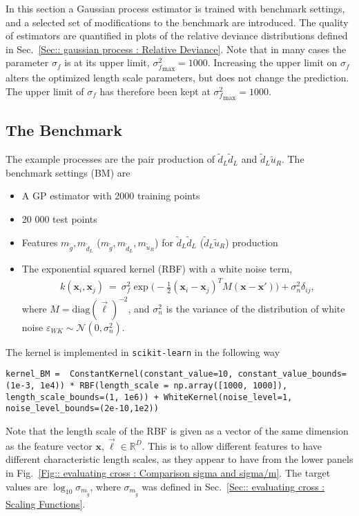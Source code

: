 \documentclass[twoside,english]{uiofysmaster}
\begin{document}
{In this section a Gaussian process estimator is trained with benchmark settings, and a selected set of modifications to the benchmark are introduced. The quality of estimators are quantified in plots of the relative deviance distributions defined in Sec.~\ref{Sec:: gaussian process : Relative Deviance}. Note that in many cases the parameter $\sigma_f$ is at its upper limit, ${\sigma_f^2}_{\mathrm{max}} = 1000$. Increasing the upper limit on $\sigma_f$ alters the optimized length scale parameters, but does not change the prediction. The upper limit of $\sigma_f$ has therefore been kept at ${\sigma_f^2}_{\mathrm{max}} = 1000$.

\subsection{The Benchmark}\label{Sec:: evaluating cross : The Benchmark}

The example processes are the pair production of $\widetilde{d}_L \widetilde{d}_L$ and $\widetilde{d}_L \widetilde{u}_R$. The benchmark settings (BM) are 
\begin{itemize}
\item A GP estimator with 2000 training points
\item 20 000 test points
\item Features $m_{\widetilde{g}}, m_{\widetilde{d}_L}$ ($m_{\widetilde{g}}, m_{\widetilde{d}_L}, m_{\widetilde{u}_R}$) for $\widetilde{d}_L \widetilde{d}_L$ ($\widetilde{d}_L \widetilde{u}_R$) production
\item The exponential squared kernel (RBF) with a white noise term, 
\begin{align}
k(\textbf{x}_i, \textbf{x}_j)~=~\sigma_f^2 \exp \big(-\frac{1}{2} (\textbf{x}_i-\textbf{x}_j)^TM(\textbf{x} - \textbf{x}') \big) + \sigma_n^2 \delta_{ij},
\end{align}
where $M = \textrm{diag}(\vec{\ell})^{-2}$, and $\sigma_n^2$ is the variance of the distribution of white noise $\varepsilon_{WK} \sim \mathcal{N}(0, \sigma_n^2)$.
\end{itemize}
The kernel is implemented in \verb|scikit-learn| in the following way 
\begin{lstlisting}
kernel_BM =  ConstantKernel(constant_value=10, constant_value_bounds=(1e-3, 1e4)) * RBF(length_scale = np.array([1000, 1000]), length_scale_bounds=(1, 1e6)) + WhiteKernel(noise_level=1, noise_level_bounds=(2e-10,1e2))
\end{lstlisting} 
Note that the length scale of the RBF is given as a vector of the same dimension as the feature vector $\textbf{x},\vec{\ell} \in \mathbb{R}^D$. This is to allow different features to have different characteristic length scales, as they appear to have from the lower panels in Fig.~\ref{Fig:: evaluating cross : Comparison sigma and sigma/m}. The target values are $\log_{10} \sigma_{m_{\widetilde{g}}}$, where $\sigma_{m_{\widetilde{g}}}$ was defined in Sec.~\ref{Sec:: evaluating cross : Scaling Functions}.

}
\end{document}

